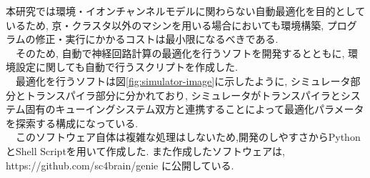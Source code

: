 本研究では環境・イオンチャンネルモデルに関わらない自動最適化を目的としているため,
京・クラスタ以外のマシンを用いる場合においても環境構築, プログラムの修正・実行にかかるコストは最小限になるべきである.\\
　そのため, 自動で神経回路計算の最適化を行うソフトを開発するとともに, 環境設定に関しても自動で行うスクリプトを作成した.\\
　最適化を行うソフトは図\ref{fig:simulator-image}に示したように, シミュレータ部分とトランスパイラ部分に分かれており,
シミュレータがトランスパイラとシステム固有のキューイングシステム双方と連携することによって最適化パラメータを探索する構成になっている.\\
　このソフトウェア自体は複雑な処理はしないため,開発のしやすさからPythonとShell Scriptを用いて作成した. また作成したソフトウェアは, https://github.com/sc4brain/genie に公開している.\\






